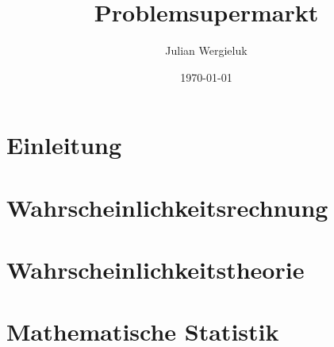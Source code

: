 \documentclass[11pt,oldfontcommands,twoside,a4paper]{memoir}
\title{Problemsupermarkt}\author{Julian Wergieluk}\date{\today}
\begin{document}
\pagestyle{headings}

\frontmatter
\maketitle
\cleartorecto

\setcounter{tocdepth}{3}
\tableofcontents

\mainmatter

\setcounter{secnumdepth}{4}
\renewcommand{\theenumi}{(\alph{enumi})}
\renewcommand{\labelenumi}{\theenumi}

\chapter*{Einleitung}


\chapter{Wahrscheinlichkeitsrechnung}


\chapter{Wahrscheinlichkeitstheorie}


\chapter{Mathematische Statistik}


%

\backmatter

\printbibliography
%
%
\end{document}
